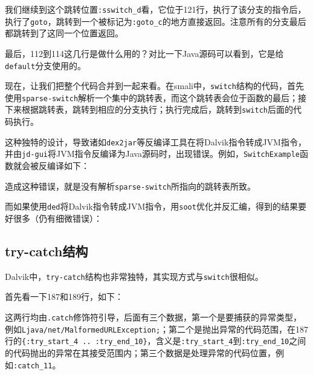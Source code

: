 我们继续到这个跳转位置\lstinline!:sswitch_d!看，它位于121行，执行了该分支的指令后，执行了\lstinline!goto!，跳转到一个被标记为\lstinline!:goto_c!的地方直接返回。注意所有的分支最后都跳转到了这同一个位置返回。

最后，112到114这几行是做什么用的？对比一下Java源码可以看到，它是给\lstinline!default!分支使用的。

现在，让我们把整个代码合并到一起来看。在smali中，\lstinline!switch!结构的代码，首先使用\lstinline!sparse-switch!解析一个集中的跳转表，而这个跳转表会位于函数的最后；接下来根据跳转表，跳转到相应的分支执行；执行完成后，跳转到\lstinline!switch!后面的代码执行。

这种独特的设计，导致诸如\lstinline!dex2jar!等反编译工具在将Dalvik指令转成JVM指令，并由\lstinline!jd-gui!将JVM指令反编译为Java源码时，出现错误。例如，\lstinline!SwitchExample!函数就会被反编译如下：

造成这种错误，就是没有解析\lstinline!sparse-switch!所指向的跳转表所致。

而如果使用\lstinline!ded!将Dalvik指令转成JVM指令，用\lstinline!soot!优化并反汇编，得到的结果要好很多（仍有细微错误）：


\subsection{try-catch结构}
\label{SubSec:dalvik-smali-trycatch}



Dalvik中，\lstinline!try-catch!结构也非常独特，其实现方式与\lstinline!switch!很相似。

首先看一下187和189行，如下：


这两行均由\lstinline!.catch!修饰符引导，后面有三个数据，第一个是要捕获的异常类型，例如\lstinline!Ljava/net/MalformedURLException;!；第二个是抛出异常的代码范围，在187行的\lstinline!{:try_start_4 .. :try_end_10}!，含义是\lstinline!:try_start_4!到\lstinline!:try_end_10!之间的代码抛出的异常在其接受范围内；第三个数据是处理异常的代码位置，例如\lstinline!:catch_11!。

